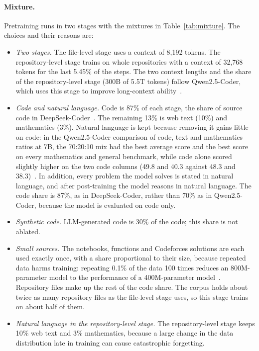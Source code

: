 \documentclass[sigconf,nonacm,balance=false]{acmart}
\begin{document}
\paragraph{Mixture.} Pretraining runs in two stages with the mixtures in Table~\ref{tab:mixture}. The choices and
their reasons are:
\begin{itemize}
  \item \emph{Two stages.} The file-level stage uses a context of 8,192 tokens. The repository-level stage trains on
  whole repositories with a context of 32,768 tokens for the last 5.45\% of the steps. The two context lengths and the
  share of the repository-level stage (300B of 5.5T tokens) follow Qwen2.5-Coder, which uses this stage to improve
  long-context ability~\cite{hui2024qwen25coder}.
  \item \emph{Code and natural language.} Code is 87\% of each stage, the share of source code in
  DeepSeek-Coder~\cite{guo2024deepseekcoder}. The remaining 13\% is web text (10\%) and mathematics (3\%). Natural
  language is kept because removing it gains little on code: in the Qwen2.5-Coder comparison of code, text and
  mathematics ratios at 7B, the 70:20:10 mix had the best average score and the best score on every mathematics and
  general benchmark, while code alone scored slightly higher on the two code columns (49.8 and 40.3 against 48.3 and
  38.3)~\cite{hui2024qwen25coder}. In addition, every problem the model solves is stated in natural language, and after
  post-training the model reasons in natural language. The code share is 87\%, as in DeepSeek-Coder, rather than 70\%
  as in Qwen2.5-Coder, because the model is evaluated on code only.
  \item \emph{Synthetic code.} LLM-generated code is 30\% of the code; this share is not ablated.
  \item \emph{Small sources.} The notebooks, functions and Codeforces solutions are each used exactly once, with a
  share proportional to their size, because repeated data harms training: repeating 0.1\% of the data 100 times
  reduces an 800M-parameter model to the performance of a 400M-parameter model~\cite{hernandez2022repeated}. Repository
  files make up the rest of the code share. The corpus holds about twice as many repository files as the file-level
  stage uses, so this stage trains on about half of them.
  \item \emph{Natural language in the repository-level stage.} The repository-level stage keeps 10\% web text and 3\%
  mathematics, because a large change in the data distribution late in training can cause catastrophic forgetting.
\end{itemize}
\end{document}
